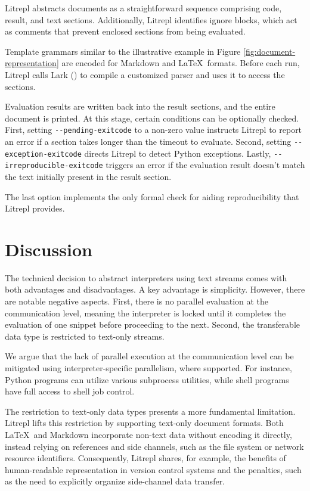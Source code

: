 \documentclass[letterpaper,12pt,twocolumn]{article}
\newcommand{\Latex}{\LaTeX\ }
\begin{document}
Litrepl abstracts documents as a straightforward sequence comprising code,
result, and text sections. Additionally, Litrepl identifies ignore blocks, which
act as comments that prevent enclosed sections from being evaluated.

Template grammars similar to the illustrative example in Figure
\ref{fig:document-representation} are encoded for Markdown and \Latex formats.
Before each run, Litrepl calls Lark (\textcite{Lark}) to compile a customized
parser and uses it to access the sections.

Evaluation results are written back into the result sections, and the entire
document is printed. At this stage, certain conditions can be optionally
checked. First, setting \verb|--pending-exitcode| to a non-zero value instructs
Litrepl to report an error if a section takes longer than the timeout to
evaluate. Second, setting \verb|--exception-exitcode| directs Litrepl to detect
Python exceptions. Lastly, \verb|--irreproducible-exitcode| triggers an error if
the evaluation result doesn't match the text initially present in the result
section.

The last option implements the only formal check for aiding reproducibility that
Litrepl provides.

\section{Discussion}

The technical decision to abstract interpreters using text streams comes with
both advantages and disadvantages. A key advantage is simplicity. However, there
are notable negative aspects. First, there is no parallel evaluation at the
communication level, meaning the interpreter is locked until it completes the
evaluation of one snippet before proceeding to the next. Second, the
transferable data type is restricted to text-only streams.

We argue that the lack of parallel execution at the communication level can be
mitigated using interpreter-specific parallelism, where supported. For instance,
Python programs can utilize various subprocess utilities, while shell programs
have full access to shell job control.

The restriction to text-only data types presents a more fundamental limitation.
Litrepl lifts this restriction by supporting text-only document formats. Both
\Latex and Markdown incorporate non-text data without encoding it directly,
instead relying on references and side channels, such as the file system or
network resource identifiers. Consequently, Litrepl shares, for example, the
benefits of human-readable representation in version control systems and the
penalties, such as the need to explicitly organize side-channel data transfer.
\end{document}
